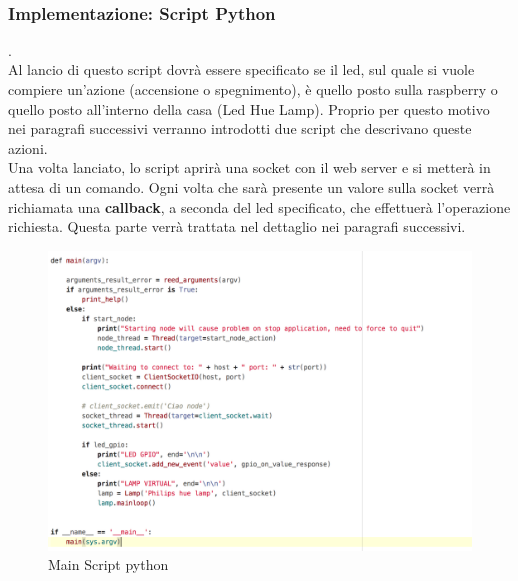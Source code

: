 \documentclass{llncs}
\begin{document}
\vspace*{1ex}
\\
\subsubsection{Implementazione: Script Python} .
\label{ImplementazioneReq4ScriptPython}
\vspace*{1ex}
\\
Al lancio di questo script dovr\`a essere specificato se il led, sul quale si vuole compiere un'azione (accensione o spegnimento), \`e quello posto sulla raspberry o quello posto all'interno della casa (Led Hue Lamp). Proprio per questo motivo nei paragrafi successivi verranno introdotti due script che descrivano queste azioni.\\
Una volta lanciato, lo script aprir\`a una socket con il web server e si metter\`a in attesa di un comando. Ogni volta che sar\`a presente un valore sulla socket verr\`a richiamata una \textbf{callback}, a seconda del led specificato, che effettuer\`a  l'operazione richiesta. Questa parte verr\`a trattata nel dettaglio nei paragrafi successivi.\\
\begin{figure}
    \centering
    \includegraphics[width=1\textwidth]{Immagini/Requisito4/pythonScriptReq4.png}
    \caption{Main Script python}
    \label{fig:MSpython}
\end{figure}
\vspace*{1ex}
\\
\end{document}
